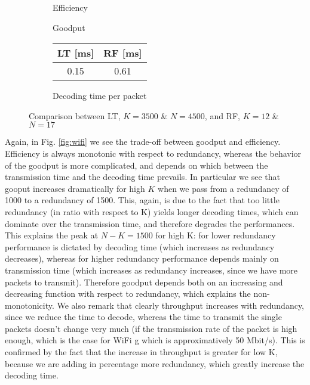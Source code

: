 \begin{figure}[!h]
\centering
\begin{subfigure}{0.23\textwidth}
	\captionsetup{justification=centering,font=scriptsize}
	\centering
	\setlength\fwidth{\textwidth}
	\setlength{}
	
	\caption{Efficiency}
	\label{fig:RF_eff}
\end{subfigure}\hspace{2em}%
\begin{subfigure}{0.23\textwidth}
	\captionsetup{justification=centering,font=scriptsize}
	\centering
	\setlength\fwidth{\textwidth}
	\setlength{}
	
	\caption{Goodput}
	\label{fig:RF_good}
\end{subfigure}\hspace{2em}%
\begin{subfigure}{0.23\textwidth}
	\captionsetup{justification=centering,font=scriptsize}
	\small
	\centering
	\begin{tabular}[c]{c|c}
		LT [ms] & RF [ms] \\ \hline
		0.15 & 0.61 \\
	\end{tabular}
	\caption{Decoding time per packet}
	\label{fig:RFLT_dectime}
\end{subfigure}
\caption{Comparison between LT, $K=3500$ \& $N=4500$, and RF, $K=12$ \& $N=17$}
\label{fig:RFLT}
\end{figure}


Again, in Fig. \ref{fig:wifi} we see the trade-off between goodput and efficiency. Efficiency is always monotonic with respect to redundancy, whereas the behavior of the goodput is more complicated, and depends on which between the transmission time and the decoding time prevails. In particular we see that gooput increases dramatically for high $K$ when we pass from a redundancy of 1000 to a redundancy of 1500. This, again, is due to the fact that too little redundancy (in ratio with respect to K) yields longer decoding times, which can dominate over the transmission time, and therefore degrades the performances. This explains the peak at $N-K=1500$ for high K: for lower redundancy performance is dictated by decoding time (which increases as redundancy decreases), whereas for higher redundancy performance depends mainly on transmission time (which increases as redundancy increases, since we have more packets to transmit). Therefore goodput depends both on an increasing and decreasing function with respect to redundancy, which explains the non-monotonicity.  We also remark that clearly throughput increases with redundancy, since we reduce the time to decode, whereas the time to transmit the single packets doesn't change very much (if the transmission rate of the packet is high enough, which is the case for WiFi g which is approximatively 50 Mbit/s). This is confirmed by the fact that the increase in throughput is greater for low K, because we are adding in percentage more redundancy, which greatly increase the decoding time. 


